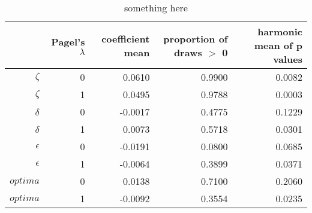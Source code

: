 \begin{table}[ht]
\centering
\begin{tabular}{rrrrr}
  \hline
 & Pagel's $\lambda$ & coefficient mean & proportion of draws $>$ 0 & harmonic mean of p values \\ 
  \hline
$\zeta $ &     0 & 0.0610 & 0.9900 & 0.0082 \\ 
  $\zeta$ &     1 & 0.0495 & 0.9788 & 0.0003 \\ 
  $\delta $ &     0 & -0.0017 & 0.4775 & 0.1229 \\ 
  $\delta$ &     1 & 0.0073 & 0.5718 & 0.0301 \\ 
  $\epsilon $ &     0 & -0.0191 & 0.0800 & 0.0685 \\ 
  $\epsilon$ &     1 & -0.0064 & 0.3899 & 0.0371 \\ 
  $optima $ &     0 & 0.0138 & 0.7100 & 0.2060 \\ 
  $optima$ &     1 & -0.0092 & 0.3554 & 0.0235 \\ 
   \hline
\end{tabular}
\caption{something here} 
\end{table}
